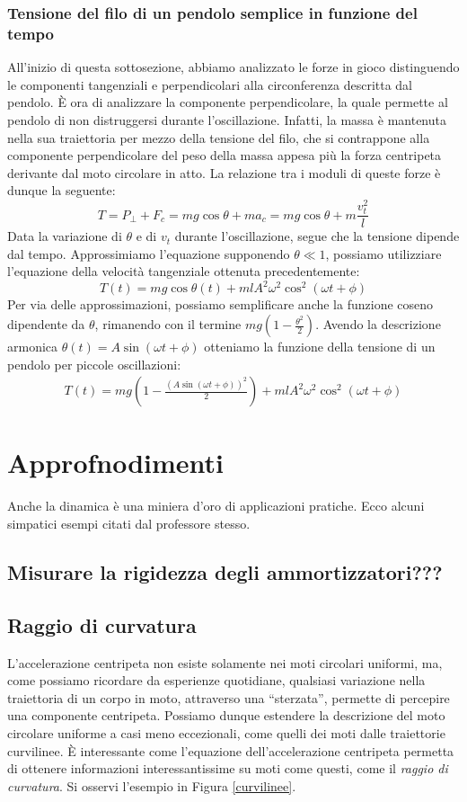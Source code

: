 \subsubsection*{Tensione del filo di un pendolo semplice in funzione del tempo}
All'inizio di questa sottosezione, abbiamo analizzato le forze in gioco
distinguendo le componenti tangenziali e perpendicolari alla circonferenza
descritta dal pendolo. È ora di analizzare la componente perpendicolare,
la quale permette al pendolo di non distruggersi durante l'oscillazione.
Infatti, la massa è mantenuta nella sua traiettoria per mezzo della tensione
del filo, che si contrappone alla componente perpendicolare del peso della
massa appesa più la forza centripeta derivante dal moto circolare in atto.
La relazione tra i moduli di queste forze è dunque la seguente:
\[T = P_\perp + F_c = mg\cos\theta + ma_c = mg\cos\theta + m\frac{v_t^2}{l} \]
Data la variazione di $\theta$ e di $v_t$ durante l'oscillazione, segue
che la tensione dipende dal tempo. Approssimiamo l'equazione supponendo
$\theta\ll1$, possiamo utilizziare
l'equazione della velocità tangenziale ottenuta precedentemente:
\[ T(t) = mg\cos\theta(t) + mlA^2\omega^2\cos^2(\omega t + \phi) \]
Per via delle approssimazioni, possiamo semplificare anche la funzione coseno
dipendente da $\theta$, rimanendo con il termine $mg(1-\frac{\theta^2}{2})$. Avendo la
descrizione armonica $\theta(t) = A\sin(\omega t + \phi)$ otteniamo la funzione
della tensione di un pendolo per piccole oscillazioni:
\begin{align}
    T(t) = mg\left(1 - \frac{(A\sin(\omega t + \phi))^2}{2}\right) + mlA^2\omega^2\cos^2(\omega t + \phi)
\end{align}



\section{Approfnodimenti}
Anche la dinamica è una miniera d'oro di applicazioni pratiche.
Ecco alcuni simpatici esempi citati dal professore stesso.

\subsection{Misurare la rigidezza degli ammortizzatori???}

\subsection{Raggio di curvatura}
L'accelerazione centripeta non esiste solamente nei moti circolari uniformi,
ma, come possiamo ricordare da esperienze quotidiane, qualsiasi variazione
nella traiettoria di un corpo in moto, attraverso una ``sterzata'', permette
di percepire una componente centripeta.
Possiamo dunque estendere la descrizione del moto circolare uniforme a casi
meno eccezionali, come quelli dei moti dalle traiettorie curvilinee. È interessante
come l'equazione dell'accelerazione centripeta permetta di ottenere informazioni
interessantissime su moti come questi, come il \textit{raggio di curvatura}. Si
osservi l'esempio in Figura \ref{curvilinee}.

